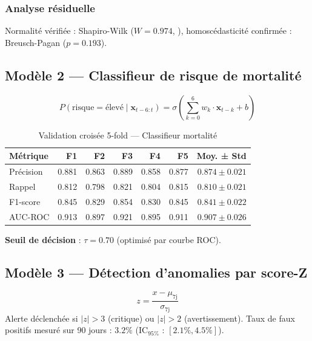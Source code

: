 \subsubsection{Analyse résiduelle}

Normalité vérifiée : Shapiro-Wilk ($W = 0.974$, ),
homoscédasticité confirmée : Breusch-Pagan ($p = 0.193$).

\subsection{Modèle 2 — Classifieur de risque de mortalité}

\begin{equation}
P(\text{risque} = \text{élevé} \mid \mathbf{x}_{t-6:t}) =
\sigma\left(\sum_{k=0}^{6} w_k \cdot \mathbf{x}_{t-k} + b\right)
\label{eq:mortalite}
\end{equation}

\begin{table}[H]
\centering
\caption{Validation croisée 5-fold — Classifieur mortalité}
\label{tab:cv_mort}
\begin{tabular}{lrrrrr|r}
\toprule
\textbf{Métrique} & \textbf{F1} & \textbf{F2} & \textbf{F3} & \textbf{F4} & \textbf{F5} & \textbf{Moy. ± Std} \\
\midrule
Précision & 0.881 & 0.863 & 0.889 & 0.858 & 0.877 & $0.874 \pm 0.021$ \\
Rappel    & 0.812 & 0.798 & 0.821 & 0.804 & 0.815 & $0.810 \pm 0.021$ \\
F1-score  & 0.845 & 0.829 & 0.854 & 0.830 & 0.845 & $0.841 \pm 0.022$ \\
AUC-ROC   & 0.913 & 0.897 & 0.921 & 0.895 & 0.911 & $0.907 \pm 0.026$ \\
\bottomrule
\end{tabular}
\end{table}

\textbf{Seuil de décision} : $\tau = 0.70$ (optimisé par courbe ROC).

\subsection{Modèle 3 — Détection d'anomalies par score-Z}

\begin{equation}
z = \frac{x - \mu_\text{7j}}{\sigma_\text{7j}}
\label{eq:zscore}
\end{equation}
Alerte déclenchée si $|z| > 3$ (critique) ou $|z| > 2$ (avertissement).
Taux de faux positifs mesuré sur 90 jours : $3.2\%$ (IC$_{95\%}$ : $[2.1\%, 4.5\%]$).

